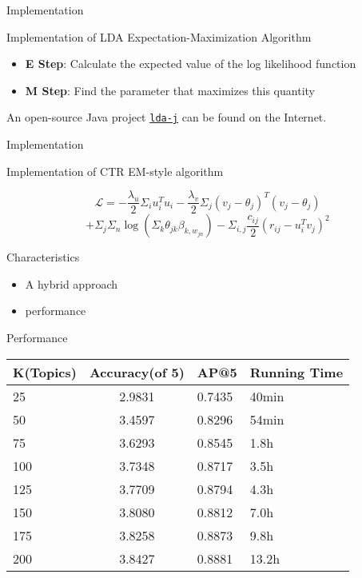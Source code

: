 \begin{frame}[c]{Implementation}
	\begin{exampleblock}{Implementation of LDA}
		Expectation-Maximization Algorithm
		\begin{itemize}
			\item \textbf{E Step}: Calculate the expected value of the log likelihood function
			\item \textbf{M Step}: Find the parameter that maximizes this quantity
		\end{itemize}

		An open-source Java project \href{http://www.arbylon.net/projects/}{\texttt{lda-j}} can be found on the Internet.
	\end{exampleblock}
\end{frame}

\begin{frame}[c]{Implementation}
	\begin{exampleblock}{Implementation of CTR}
		EM-style algorithm

		$$\mathcal{L}=-\frac{\lambda_u}{2}\Sigma_iu_i^Tu_i-\frac{\lambda_v}{2}\Sigma_j(v_j-\theta_j)^T(v_j-\theta_j)$$
		$$+\Sigma_j\Sigma_n\log(\Sigma_k\theta_{jk}\beta_{k,w_{jn}})-\Sigma_{i,j}\frac{c_{ij}}{2}(r_{ij}-u_i^Tv_j)^2$$
	\end{exampleblock}
\end{frame}

\begin{frame}[c]{Characteristics}
	\Large
	\begin{itemize}
		\item A hybrid approach
		\item {} performance
	\end{itemize}
	\normalsize
\end{frame}

\begin{frame}[c]{Performance}
	\begin{tabular}{lcll}\hline 
	\textbf{K(Topics)} & \textbf{Accuracy(of 5)} & \textbf{AP@5} & \textbf{Running Time} \\
	\hline
25 & 2.9831 & 0.7435 & 40min\\
50 & 3.4597 & 0.8296 & 54min\\
75 & 3.6293 & 0.8545 & 1.8h\\
100 & 3.7348 & 0.8717 & 3.5h\\
125 & 3.7709 & 0.8794 & 4.3h\\
150 & 3.8080 & 0.8812 & 7.0h\\
175 & 3.8258 & 0.8873 & 9.8h\\
200 & 3.8427 & 0.8881 & 13.2h\\
	\hline 
	\end{tabular}
\end{frame}


